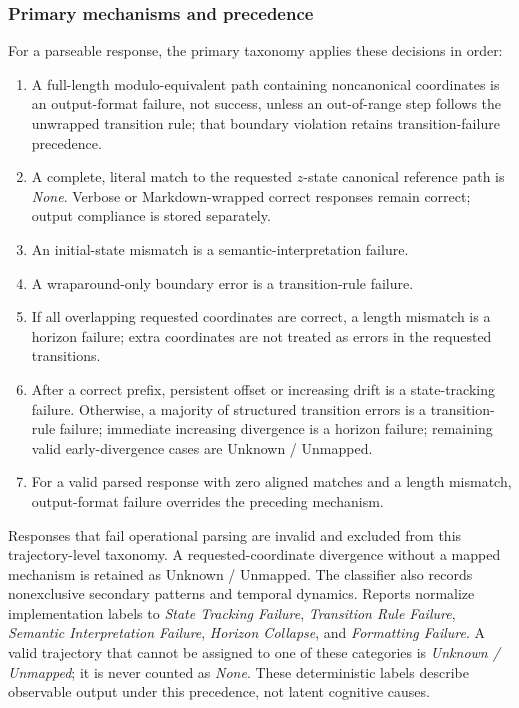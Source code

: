\documentclass{article}
\begin{document}
\subsubsection{Primary mechanisms and precedence}
    For a parseable response, the primary taxonomy applies these decisions in
    order:
\begin{enumerate}
        \item A full-length modulo-equivalent path containing noncanonical
        coordinates is an output-format failure, not success, unless an
        out-of-range step follows the unwrapped transition rule; that boundary
        violation retains transition-failure precedence.
        \item A complete, literal match to the requested $z$-state canonical reference path is
        \emph{None}. Verbose or Markdown-wrapped correct responses remain correct;
        output compliance is stored separately.
    \item An initial-state mismatch is a semantic-interpretation failure.
    \item A wraparound-only boundary error is a transition-rule failure.
        \item If all overlapping requested coordinates are correct, a length
        mismatch is a horizon failure; extra coordinates are not treated as
        errors in the requested transitions.
    \item After a correct prefix, persistent offset or increasing drift is a
    state-tracking failure. Otherwise, a majority of structured transition
    errors is a transition-rule failure; immediate increasing divergence is a
    horizon failure; remaining valid early-divergence cases are
    Unknown / Unmapped.
        \item For a valid parsed response with zero aligned matches and a length
        mismatch, output-format failure overrides the preceding mechanism.
\end{enumerate}
    Responses that fail operational parsing are invalid and excluded from this
    trajectory-level taxonomy. A requested-coordinate divergence without a
    mapped mechanism is retained as Unknown / Unmapped.
The classifier also records nonexclusive secondary patterns and temporal
dynamics. Reports normalize implementation labels to \emph{State Tracking
Failure}, \emph{Transition Rule Failure}, \emph{Semantic Interpretation
Failure}, \emph{Horizon Collapse}, and \emph{Formatting Failure}. A valid
trajectory that cannot be assigned to one of these categories is
\emph{Unknown / Unmapped}; it is never counted as \emph{None}.
These deterministic labels describe
observable output under this precedence, not latent cognitive causes.
\end{document}
